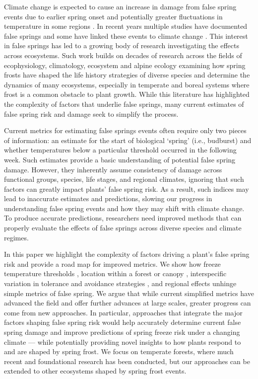 \documentclass{article}\usepackage[]{graphicx}\usepackage[]{color}
\begin{document}
Climate change is expected to cause an increase in damage from false spring events due to earlier spring onset and potentially greater fluctuations in temperature in some regions \citep{Inouye2008, Martin2010}. In recent years multiple studies have documented false springs \citep{Augspurger2009, Augspurger2013, Gu2008, Menzel2015} and some have linked these events to climate change \citep{Allstadt2015, Ault2013,  Muffler2016, Vitra2017, Xin2016}. This interest in false springs has led to a growing body of research investigating the effects across ecosystems. Such work builds on decades of research across the fields of ecophysiology, climatology, ecosystem and alpine ecology examining how spring frosts have shaped the life history strategies of diverse species and determine the dynamics of many ecosystems, especially in temperate and boreal systems where frost is a common obstacle to plant growth. While this literature has highlighted the complexity of factors that underlie false springs, many current estimates of false spring risk and damage seek to simplify the process. 

Current metrics for estimating false springs events often require only two pieces of information: an estimate for the start of biological `spring' (i.e., budburst) and whether temperatures below a particular threshold occurred in the following week. Such estimates provide a basic understanding of potential false spring damage. However, they inherently assume consistency of damage across functional groups, species, life stages, and regional climates, ignoring that such factors can greatly impact plants' false spring risk. As a result, such indices may lead to inaccurate estimates and predictions, slowing our progress in understanding false spring events and how they may shift with climate change. To produce accurate predictions, researchers need improved methods that can properly evaluate the effects of false springs across diverse species and climate regimes.

In this paper we highlight the complexity of factors driving a plant's false spring risk and provide a road map for improved metrics. We show how freeze temperature thresholds \citep{Lenz2013}, location within a forest or canopy \citep{Augspurger2013}, interspecific variation in tolerance and avoidance strategies \citep{Martin2010, Muffler2016}, and regional effects \citep{Muffler2016} unhinge simple metrics of false spring. We argue that while current simplified metrics have advanced the field and offer further advances at large scales, greater progress can come from new approaches. In particular, approaches that integrate the major factors shaping false spring risk would help accurately determine current false spring damage and improve predictions of spring freeze risk under a changing climate --- while potentially providing novel insights to how plants respond to and are shaped by spring frost. We focus on temperate forests, where much recent and foundational research has been conducted, but our approaches can be extended to other ecosystems shaped by spring frost events.   
\end{document}
